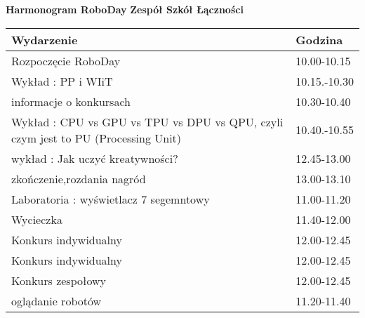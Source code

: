 \documentclass{article}
\begin{document}
\begin{center}
\Large\textbf{Harmonogram RoboDay}
\large\textbf{Zespół Szkół Łączności}
\end{center}
\vspace{1cm}
\begin{center}
\begin{tabular}{|l|l|}
\hline
\textbf{Wydarzenie} & \textbf{Godzina} \\
\hline
Rozpoczęcie RoboDay & 10.00-10.15 \\
\hline
Wykład : PP i WIiT & 10.15.-10.30 \\
\hline
informacje o konkursach & 10.30-10.40 \\
\hline
Wykład : CPU vs GPU vs TPU vs DPU vs QPU, czyli czym jest to PU (Processing Unit) & 10.40.-10.55 \\
\hline
wykład : Jak uczyć kreatywności? & 12.45-13.00 \\
\hline
zkończenie,rozdania nagród & 13.00-13.10 \\
\hline
Laboratoria : wyświetlacz 7 segemntowy & 11.00-11.20 \\
\hline
Wycieczka  & 11.40-12.00 \\
\hline
Konkurs indywidualny & 12.00-12.45 \\
\hline
Konkurs indywidualny & 12.00-12.45 \\
\hline
Konkurs zespołowy & 12.00-12.45 \\
\hline
oglądanie robotów & 11.20-11.40 \\
\hline
\end{tabular}
\end{center}
\end{document}
